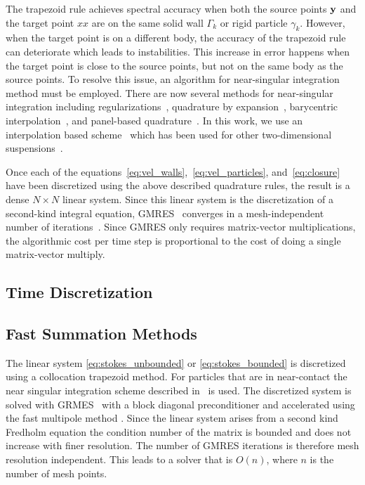 \documentclass[preprint, 10pt]{elsarticle}
\begin{document}
The trapezoid rule achieves spectral accuracy when both the source
points ${\mathbf{y}}$ and the target point $xx$ are on the same solid wall
$\Gamma_k$ or rigid particle $\gamma_k$.  However, when the target point
is on a different body, the accuracy of the trapezoid rule can
deteriorate which leads to instabilities.  This increase in error
happens when the target point is close to the source points, but not on
the same body as the source points.  To resolve this issue, an algorithm
for near-singular integration method must be employed.  There are now
several methods for near-singular integration including
regularizations~\cite{bea-yin-wil2016, bea-lai2001}, quadrature by
expansion~\cite{Klockner2013}, barycentric
interpolation~\cite{bar-wu-vee2015}, and panel-based
quadrature~\cite{hel-oja2008}.  In this work, we use an interpolation
based scheme~\cite{Ying2006} which has been used for other
two-dimensional suspensions~\cite{Quaife2014}.

Once each of the
equations~\eqref{eq:vel_walls},~\eqref{eq:vel_particles},
and~\eqref{eq:closure} have been discretized using the above described
quadrature rules, the result is a dense $N \times N$ linear system.
Since this linear system is the discretization of a second-kind integral
equation, GMRES~\cite{Saad1986} converges in a mesh-independent number of
iterations~\cite{cam-ips-kel-mey-xue1996}.  Since GMRES only requires
matrix-vector multiplications, the algorithmic cost per time step is
proportional to the cost of doing a single matrix-vector multiply.




\subsection{Time Discretization}



\subsection{Fast Summation Methods}




The linear system \eqref{eq:stokes_unbounded} or
\eqref{eq:stokes_bounded} is discretized using a collocation trapezoid
method. For particles that are in near-contact the near singular
integration scheme described in~\cite{Quaife2014, Ying2006} is used. The
discretized system is solved with GRMES~\cite{Saad1986} with a block
diagonal preconditioner and accelerated using the fast multipole method
\cite{Greengard1987}.  Since the linear system arises from a second kind
Fredholm equation the condition number of the matrix is bounded and does
not increase with finer resolution. The number of GMRES iterations is
therefore mesh resolution independent. This leads to a solver that is
$O(n)$, where $n$ is the number of mesh points. 
\end{document}
